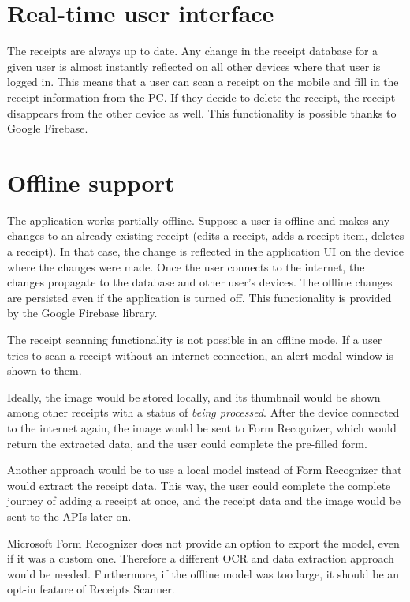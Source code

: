 \documentclass[
  digital, %
  table,   %
  oneside, %
  lof,     %
  lot,     %
]{fithesis3}
\begin{document}
\section{Real-time user interface}
The receipts are always up to date. Any change in the receipt database for a given user is almost instantly reflected on all other devices where that user is logged in. This means that a user can scan a receipt on the mobile and fill in the receipt information from the PC. If they decide to delete the receipt, the receipt disappears from the other device as well.
This functionality is possible thanks to Google Firebase.

\section{Offline support}
The application works partially offline. Suppose a user is offline and makes any changes to an already existing receipt (edits a receipt, adds a receipt item, deletes a receipt). In that case, the change is reflected in the application UI on the device where the changes were made. Once the user connects to the internet, the changes propagate to the database and other user's devices. The offline changes are persisted even if the application is turned off. This functionality is provided by the Google Firebase library.

The receipt scanning functionality is not possible in an offline mode. If a user tries to scan a receipt without an internet connection, an alert modal window is shown to them.

Ideally, the image would be stored locally, and its thumbnail would be shown among other receipts with a status of \textit{being processed}. After the device connected to the internet again, the image would be sent to Form Recognizer, which would return the extracted data, and the user could complete the pre-filled form.

Another approach would be to use a local model instead of Form Recognizer that would extract the receipt data. This way, the user could complete the complete journey of adding a receipt at once, and the receipt data and the image would be sent to the APIs later on.

Microsoft Form Recognizer does not provide an option to export the model, even if it was a custom one. Therefore a different OCR and data extraction approach would be needed. Furthermore, if the offline model was too large, it should be an opt-in feature of Receipts Scanner.
\end{document}
